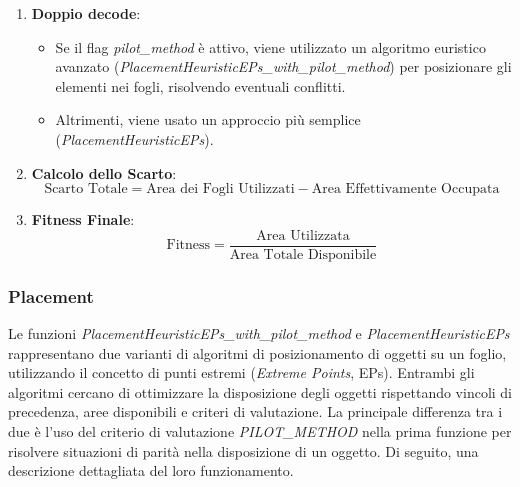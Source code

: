 \begin{enumerate}
    \item \textbf{Doppio decode}:
    \begin{itemize}
        \item Se il flag \emph{pilot\_method} è attivo, viene utilizzato un algoritmo euristico avanzato (\emph{PlacementHeuristicEPs\_with\_pilot\_method}) per posizionare gli elementi nei fogli, risolvendo eventuali conflitti.
        \item Altrimenti, viene usato un approccio più semplice (\emph{PlacementHeuristicEPs}).
    \end{itemize}
    \item \textbf{Calcolo dello Scarto}:
    \[
    \text{Scarto Totale} = \text{Area dei Fogli Utilizzati} - \text{Area Effettivamente Occupata}
    \]
    \item \textbf{Fitness Finale}:
    \[
    \text{Fitness} = \frac{\text{Area Utilizzata}}{\text{Area Totale Disponibile}}
    \]
\end{enumerate}

\subsubsection*{Placement}

Le funzioni \emph{PlacementHeuristicEPs\_with\_pilot\_method} e \emph{PlacementHeuristicEPs} rappresentano due varianti di algoritmi di posizionamento di oggetti su un foglio, utilizzando il concetto di punti estremi (\emph{Extreme Points}, EPs). Entrambi gli algoritmi cercano di ottimizzare la disposizione degli oggetti rispettando vincoli di precedenza, aree disponibili e criteri di valutazione. La principale differenza tra i due è l'uso del criterio di valutazione \emph{PILOT\_METHOD} nella prima funzione per risolvere situazioni di parità nella disposizione di un oggetto. Di seguito, una descrizione dettagliata del loro funzionamento.

